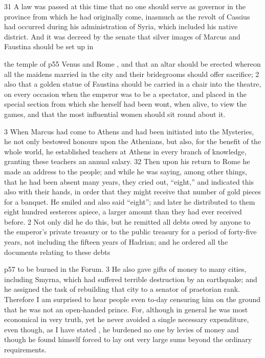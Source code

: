 31
A law was passed at this time that no one should serve as governor in the province from which he had originally come, inasmuch as the revolt of Cassius had occurred during his administration of Syria, which included his native district. And it was decreed by the senate that silver images of Marcus and Faustina should be set up in

the temple of p55 Venus and Rome , and that an altar should be erected whereon all the maidens married in the city and their bridegrooms should offer sacrifice; 2 also that a golden statue of Faustina should be carried in a chair into the theatre, on every occasion when the emperor was to be a spectator, and placed in the special section from which she herself had been wont, when alive, to view the games, and that the most influential women should sit round about it.

3
When Marcus had come to Athens and had been initiated into the Mysteries, he not only bestowed honours upon the Athenians, but also, for the benefit of the whole world, he established teachers at Athens in every branch of knowledge, granting these teachers an annual salary. 32 Then upon his return to Rome he made an address to the people; and while he was saying, among other things, that he had been absent many years, they cried out, ``eight,'' and indicated this also with their hands, in order that they might receive that number of gold pieces\texthebrew{⁠} for a banquet. He smiled and also said ``eight''; and later he distributed to them eight hundred sesterces apiece, a larger amount than they had ever received before. 2 Not only did he do this, but he remitted all debts owed by anyone to the emperor's private treasury or to the public treasury for a period of forty-five years, not including the fifteen years of Hadrian;\texthebrew{⁠} and he ordered all the documents relating to these debts

p57 to be burned in the Forum. 3 He also gave gifts of money to many cities, including Smyrna, which had suffered terrible destruction by an earthquake; and he assigned the task of rebuilding that city to a senator of praetorian rank. Therefore I am surprised to hear people even to\texthebrew{‑}day censuring him on the ground that he was not an open-handed prince. For, although in general he was most economical in very truth, yet he never avoided a single necessary expenditure, even though, as I have stated ,\texthebrew{⁠} he burdened no one by levies of money and though he found himself forced to lay out very large sums beyond the ordinary requirements.

